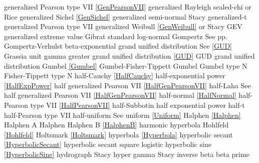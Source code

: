 generalized Pearson type VII	\dotfill	\eqref{GenPearsonVII}				\ncite
generalized Rayleigh	 		\dotfill	scaled-chi or Rice					\ncite	%
generalized Sichel				\dotfill	\eqref{GenSichel}					\mcite{\self}
generalized semi-normal			\dotfill	Stacy 								   	%
generalized-t					\dotfill	generalized Pearson type VII		\ncite
generalized Weibull				\dotfill	\eqref{GenWeibull} or Stacy			\ncite	%
GEV 							\dotfill	generalized extreme value 			\ncite	%
Gibrat							\dotfill	standard log-normal 				\ncite 	%
Gompertz						\dotfill 	See pp.~\pageref{Gompertz}			\ncite
Gompertz-Verhulst				\dotfill	beta-exponential 					    	%
grand unified distribution		\dotfill	See \eqref{GUD}						\mcite{\self}	%
Grassia							\dotfill	unit gamma							
greater grand unified distribution \dotfill	\eqref{GUD}							\mcite{\self}
GUD								\dotfill	grand unified distribution			\mcite{\self}	%
Gumbel 							\dotfill	\eqref{Gumbel} 						\ncite	%
Gumbel-Fisher-Tippett			\dotfill	Gumbel 								\ncite 	%
Gumbel type N 					\dotfill	Fisher-Tippett type N 				\ncite	%
%
half-Cauchy						\dotfill	\eqref{HalfCauchy}					\ncite	%
half-exponential power			\dotfill	\eqref{HalfExpPower}				\ncite	%
half generalized Pearson VII	\dotfill	\eqref{HalfGenPearsonVII}			\ncite	%
half-Laha						\dotfill	See half generalized Pearson VII \eqref{HalfGenPearsonVII}	\mcite{\self}	%
half-normal 					\dotfill	\eqref{HalfNormal}					\ncite	%
half-Pearson type VII			\dotfill	\eqref{HalfPearsonVII} 				\ncite	%
half-Subbotin					\dotfill	half exponential power				\ncite	%
half-t							\dotfill	half-Pearson type VII				\ncite	%
half-uniform 					\dotfill	See uniform \eqref{Uniform} 		\ncite	%
Halphen							\dotfill	\eqref{Halphen}						\ncite
Halphen A						\dotfill	Halphen								\ncite
Halphen B						\dotfill	\eqref{HalphenB}					\ncite
harmonic						\dotfill	hyperbola							\ncite
Hohlfeld						\dotfill	\eqref{Hohlfeld}					\mcite{\self}	%
Holtsmark						\dotfill	\eqref{Holtsmark}					\ncite
hyperbola						\dotfill	\eqref{Hyperbola}					\ncite	
hyperbolic secant 				\dotfill	\eqref{HyperbolicSecant}			\ncite	%
hyperbolic secant square		\dotfill	logistic 							\ncite	%
hyperbolic sine					\dotfill	\eqref{HyperbolicSine}				\mcite{\self}	%
hydrograph						\dotfill	Stacy 								\ncite	%
hyper gamma   					\dotfill	Stacy								\ncite	%
%
inverse beta					\dotfill	beta prime 							\ncite	%
